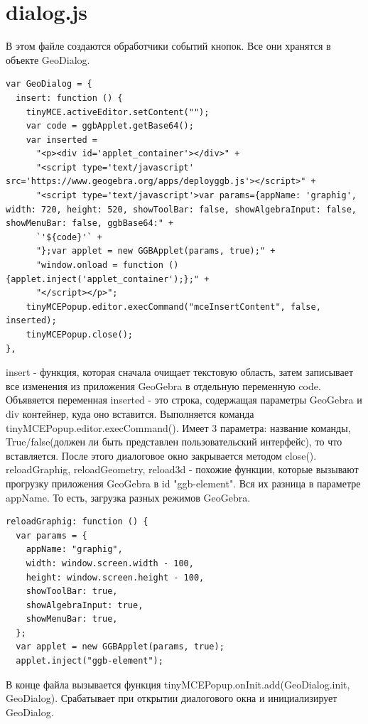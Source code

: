 \documentclass[14pt,Diplom]{diplomwork}
\begin{document}
\section{dialog.js}
В этом файле создаются обработчики событий кнопок. Все они хранятся в объекте GeoDialog.
\begin{verbatim}
var GeoDialog = {
  insert: function () {
    tinyMCE.activeEditor.setContent("");
    var code = ggbApplet.getBase64();
    var inserted =
      "<p><div id='applet_container'></div>" +
      "<script type='text/javascript' src='https://www.geogebra.org/apps/deployggb.js'></script>" +
      "<script type='text/javascript'>var params={appName: 'graphig', width: 720, height: 520, showToolBar: false, showAlgebraInput: false, showMenuBar: false, ggbBase64:" +
      `'${code}'` +
      "};var applet = new GGBApplet(params, true);" +
      "window.onload = function () {applet.inject('applet_container');};" +
      "</script></p>";
    tinyMCEPopup.editor.execCommand("mceInsertContent", false, inserted);
    tinyMCEPopup.close();
},
\end{verbatim}
insert - функция, которая сначала очищает текстовую область, затем записывает все изменения из приложения GeoGebra в отдельную переменную code. Объявяется переменная inserted - это строка, содержащая параметры GeoGebra и div контейнер, куда оно вставится. Выполняется команда tinyMCEPopup.editor.execCommand(). Имеет 3 параметра: название команды, True/false(должен ли быть представлен пользовательский интерфейс), то что вставляется. После этого диалоговое окно закрывается методом close().\\

reloadGraphig, reloadGeometry, reload3d - похожие функции, которые вызывают прогрузку приложения GeoGebra в id "ggb-element". Вся их разница в параметре appName. То есть, загрузка разных режимов GeoGebra.
\begin{verbatim}
reloadGraphig: function () {
  var params = {
    appName: "graphig",
    width: window.screen.width - 100,
    height: window.screen.height - 100,
    showToolBar: true,
    showAlgebraInput: true,
    showMenuBar: true,
  };
  var applet = new GGBApplet(params, true);
  applet.inject("ggb-element");
\end{verbatim}

В конце файла вызывается функция tinyMCEPopup.onInit.add(GeoDialog.init, GeoDialog). Срабатывает при открытии диалогового окна и инициализирует GeoDialog.
\end{document}
